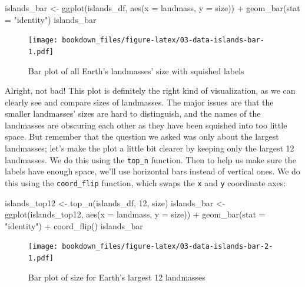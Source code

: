 \documentclass[
]{krantz}
\makeatletter
\newenvironment{Shaded}{\begin{snugshade}}{\end{snugshade}}
\newcommand{\AttributeTok}[1]{\textcolor[rgb]{0.61,0.61,0.61}{#1}}
\newcommand{\DecValTok}[1]{\textcolor[rgb]{0.06,0.06,0.06}{#1}}
\newcommand{\FunctionTok}[1]{\textcolor[rgb]{0,0,0}{#1}}
\newcommand{\NormalTok}[1]{#1}
\newcommand{\OtherTok}[1]{\textcolor[rgb]{0.37,0.37,0.37}{#1}}
\newcommand{\SpecialCharTok}[1]{\textcolor[rgb]{0,0,0}{#1}}
\newcommand{\StringTok}[1]{\textcolor[rgb]{0.5,0.5,0.5}{#1}}
\newenvironment{kframe}{%
\medskip{}
\setlength{\fboxsep}{.8em}
 \def\at@end@of@kframe{}%
 \ifinner\ifhmode%
  \def\at@end@of@kframe{\end{minipage}}%
  \begin{minipage}{\columnwidth}%
 \fi\fi%
 \def\FrameCommand##1{\hskip\@totalleftmargin \hskip-\fboxsep
 \colorbox{shadecolor}{##1}\hskip-\fboxsep
     \hskip-\linewidth \hskip-\@totalleftmargin \hskip\columnwidth}%
 \MakeFramed {\advance\hsize-\width
   \@totalleftmargin\z@ \linewidth\hsize
   \@setminipage}}%
 {\par\unskip\endMakeFramed%
 \at@end@of@kframe}
\renewenvironment{Shaded}{\begin{kframe}}{\end{kframe}}
\makeatother
\begin{document}
\begin{Shaded}
\begin{Highlighting}[]
\NormalTok{islands\_bar }\OtherTok{\textless{}{-}} \FunctionTok{ggplot}\NormalTok{(islands\_df, }\FunctionTok{aes}\NormalTok{(}\AttributeTok{x =}\NormalTok{ landmass, }\AttributeTok{y =}\NormalTok{ size)) }\SpecialCharTok{+}
  \FunctionTok{geom\_bar}\NormalTok{(}\AttributeTok{stat =} \StringTok{"identity"}\NormalTok{)}
\NormalTok{islands\_bar}
\end{Highlighting}
\end{Shaded}

\begin{figure}
\centering
\texttt{[image: bookdown\_files/figure-latex/03-data-islands-bar-1.pdf]}
\caption{\label{fig:03-data-islands-bar}Bar plot of all Earth's landmasses' size with squished labels}
\end{figure}

Alright, not bad! This plot is definitely the right kind of visualization, as we can clearly see and compare sizes of landmasses. The major issues are that the smaller landmasses' sizes are hard to distinguish, and the names of the landmasses are obscuring each other as they have been squished into too little space. But remember that the question we asked was only about the largest landmasses; let's make the plot a little bit clearer by keeping only the largest 12 landmasses. We do this using the \texttt{top\_n} function.
Then to help us make sure the labels have enough space, we'll use horizontal bars instead of vertical ones. We do this using the
\texttt{coord\_flip} function, which swaps the \texttt{x} and \texttt{y} coordinate axes:

\begin{Shaded}
\begin{Highlighting}[]
\NormalTok{islands\_top12 }\OtherTok{\textless{}{-}} \FunctionTok{top\_n}\NormalTok{(islands\_df, }\DecValTok{12}\NormalTok{, size)}
\NormalTok{islands\_bar }\OtherTok{\textless{}{-}} \FunctionTok{ggplot}\NormalTok{(islands\_top12, }\FunctionTok{aes}\NormalTok{(}\AttributeTok{x =}\NormalTok{ landmass, }\AttributeTok{y =}\NormalTok{ size)) }\SpecialCharTok{+}
  \FunctionTok{geom\_bar}\NormalTok{(}\AttributeTok{stat =} \StringTok{"identity"}\NormalTok{) }\SpecialCharTok{+}
  \FunctionTok{coord\_flip}\NormalTok{()}
\NormalTok{islands\_bar}
\end{Highlighting}
\end{Shaded}

\begin{figure}
\centering
\texttt{[image: bookdown\_files/figure-latex/03-data-islands-bar-2-1.pdf]}
\caption{\label{fig:03-data-islands-bar-2}Bar plot of size for Earth's largest 12 landmasses}
\end{figure}
\end{document}
